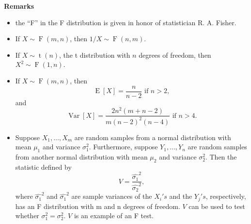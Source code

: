 \documentclass[12pt]{article}
\begin{document}
\textbf{Remarks}
\begin{itemize}
\item the ``F'' in the F distribution is given in honor of statistician  R. A. Fisher.
\item If $X\sim \operatorname{F}(m,n)$, then $1/X\sim \operatorname{F}(n,m)$. 
\item If $X\sim \operatorname{t}(n)$, the t distribution with $n$ degrees of freedom, then $X^2\sim \operatorname{F}(1,n)$.
\item If $X\sim \operatorname{F}(m,n)$, then $$\operatorname{E}[X] = \frac{n}{n-2}\mbox{ if }n>2,$$ and 
$$\operatorname{Var}[X] = \frac{2n^2(m+n-2)}{m(n-2)^2(n-4)}\mbox{ if }n>4.$$
\item Suppose $X_1,\ldots,X_m$ are random samples from a normal distribution with mean $\mu_1$ and variance $\sigma_1^2$.  Furthermore, suppose $Y_1,\ldots,Y_n$ are random samples from another normal distribution with mean $\mu_2$ and variance $\sigma_2^2$.  Then the statistic defined by $$V=\frac{\hat{\sigma_1}^2}{\hat{\sigma_2}^2},$$ where $\hat{\sigma_1}^2$ and $\hat{\sigma_1}^2$ are sample variances of the $X_i's$ and the $Y_j's$, respectively, has an F distribution with m and n degrees of freedom.  $V$ can be used to test whether $\sigma_1^2=\sigma_2^2$.  $V$ is an example of an F test.
\end{itemize}
\end{document}
